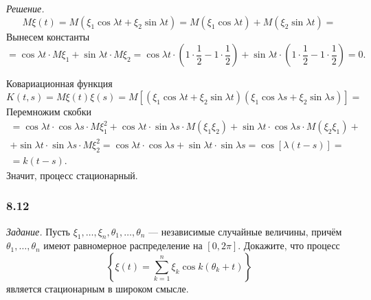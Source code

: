\textit{Решение.}
$$M \xi \left( t \right) =
  M \left( \xi_1 \cos \lambda t + \xi_2 \sin \lambda t \right) =
  M \left( \xi_1 \cos \lambda t \right) + M \left( \xi_2 \sin \lambda t \right) =$$
Вынесем константы
$$= \cos \lambda t \cdot M \xi_1 + \sin \lambda t \cdot M \xi_2 =
  \cos \lambda t \cdot \left( 1 \cdot \frac{1}{2} - 1 \cdot \frac{1}{2} \right) +
  \sin \lambda t \cdot \left( 1 \cdot \frac{1}{2} - 1 \cdot \frac{1}{2} \right) =
  0.$$

Ковариационная функция
$$K \left( t, s \right) =
  M \xi \left( t \right) \xi \left( s \right) =
  M \left[
    \left( \xi_1 \cos \lambda t + \xi_2 \sin \lambda t \right)
    \left( \xi_1 \cos \lambda s + \xi_2 \sin \lambda s \right) \right] =$$
Перемножим скобки
\begin{gather*}
  = \cos \lambda t \cdot \cos \lambda s \cdot M \xi_1^2 +
  \cos \lambda t \cdot \sin \lambda s \cdot M \left( \xi_1 \xi_2 \right) +
  \sin \lambda t \cdot \cos \lambda s \cdot M \left( \xi_2 \xi_1 \right) + \\
  + \sin \lambda t \cdot \sin \lambda s \cdot M \xi_2^2 =
  \cos \lambda t \cdot \cos \lambda s + \sin \lambda t \cdot \sin \lambda s =
  \cos \left[ \lambda \left( t - s \right) \right] = \\
  = k \left( t - s \right).
\end{gather*}
Значит, процесс стационарный.

\subsubsection*{8.12}

\textit{Задание.}
Пусть $ \xi_1, \dotsc, \xi_n, \theta_1, \dotsc, \theta_n$ --- независимые случайные величины,
причём $ \theta_1, \dotsc, \theta_n$ имеют равномерное распределение на $ \left[ 0, 2 \pi \right] $.
Докажите, что процесс
$$ \left\{
    \xi \left( t \right) = \sum \limits_{k = 1}^n \xi_k \cos k \left( \theta_k + t \right)
  \right\} $$
является стационарным в широком смысле.

